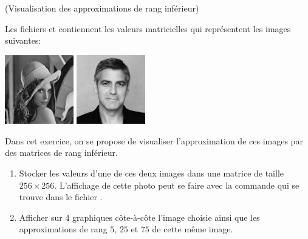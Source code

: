 \documentclass[a4paper,12pt,reqno]{amsart}
\begin{document}
\begin{exo} (Visualisation des approximations de rang inférieur)

  Les fichiers  et  contiennent les valeurs matricielles qui représentent les images suivantes:

  \begin{center}
    \includegraphics[width=3cm]{lena} \qquad \includegraphics[width=3cm]{george}
  \end{center}

  Dans cet exercice, on se propose de visualiser l'approximation de ces images par des matrices de rang inférieur.
  \begin{enumerate}
    \item Stocker les valeurs d'une de ces deux images dans une matrice  de taille $256 \times 256$. L'affichage de cette photo peut se faire avec la commande  qui se trouve dans le fichier .

    \item Afficher sur 4 graphiques côte-à-côte l'image choisie ainsi que les approximations de rang $5$, $25$ et $75$ de cette même image.
  \end{enumerate}

\end{exo}
\end{document}
